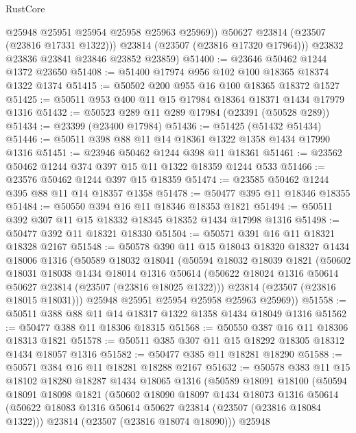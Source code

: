 \begin{lexlean}{RustCore}
\begin{coremodule}
              @25948
              @25951
              @25954
              @25958
              @25963
              @25969))
          @50627
          @23814
          (@23507 (@23816 @17331 @1322)))
        @23814
        (@23507 (@23816 @17320 @17964)))
      @23832
      @23836
      @23841
      @23846
      @23852
      @23859)
@51400 := @23646 @50462 @1244 @1372 @23650
@51408 := @51400 @17974 @956 @102 @100 @18365 @18374 @1322 @1374
@51415 := @50502 @200 @955 @16 @100 @18365 @18372 @1527
@51425 := @50511 @953 @400 @11 @15 @17984 @18364 @18371 @1434 @17979 @1316
@51432 := @50523 @289 @11 @289 @17984 (@23391 (@50528 @289))
@51434 := @23399 (@23400 @17984)
@51436 := @51425 (@51432 @51434)
@51446 := @50511 @398 @88 @11 @14 @18361 @1322 @1358 @1434 @17990 @1316
@51451 := @23946 @50462 @1244 @398 @11 @18361
@51461 := @23562 @50462 @1244 @374 @397 @15 @11 @1322 @18359 @1244 @533
@51466 := @23576 @50462 @1244 @397 @15 @18359
@51474 := @23585 @50462 @1244 @395 @88 @11 @14 @18357 @1358
@51478 := @50477 @395 @11 @18346 @18355
@51484 := @50550 @394 @16 @11 @18346 @18353 @1821
@51494 := @50511 @392 @307 @11 @15 @18332 @18345 @18352 @1434 @17998 @1316
@51498 := @50477 @392 @11 @18321 @18330
@51504 := @50571 @391 @16 @11 @18321 @18328 @2167
@51548 := @50578
    @390
    @11
    @15
    @18043
    @18320
    @18327
    @1434
    @18006
    @1316
    (@50589
      @18032
      @18041
      (@50594
        @18032
        @18039
        @1821
        (@50602
          @18031
          @18038
          @1434
          @18014
          @1316
          @50614
          (@50622 @18024 @1316 @50614 @50627 @23814 (@23507 (@23816 @18025 @1322)))
          @23814
          (@23507 (@23816 @18015 @18031)))
        @25948
        @25951
        @25954
        @25958
        @25963
        @25969))
@51558 := @50511 @388 @88 @11 @14 @18317 @1322 @1358 @1434 @18049 @1316
@51562 := @50477 @388 @11 @18306 @18315
@51568 := @50550 @387 @16 @11 @18306 @18313 @1821
@51578 := @50511 @385 @307 @11 @15 @18292 @18305 @18312 @1434 @18057 @1316
@51582 := @50477 @385 @11 @18281 @18290
@51588 := @50571 @384 @16 @11 @18281 @18288 @2167
@51632 := @50578
    @383
    @11
    @15
    @18102
    @18280
    @18287
    @1434
    @18065
    @1316
    (@50589
      @18091
      @18100
      (@50594
        @18091
        @18098
        @1821
        (@50602
          @18090
          @18097
          @1434
          @18073
          @1316
          @50614
          (@50622 @18083 @1316 @50614 @50627 @23814 (@23507 (@23816 @18084 @1322)))
          @23814
          (@23507 (@23816 @18074 @18090)))
        @25948

\end{coremodule}
\end{lexlean}
